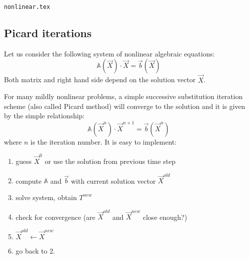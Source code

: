 \begin{flushright} {\tiny {\color{gray} \tt nonlinear.tex}} \end{flushright}




\subsection{Picard iterations} \label{ss:picard}

Let us consider the following system of nonlinear algebraic equations:
\[
\mathbb{A}(\vec X) \cdot \vec X = \vec b(\vec X)
\]
Both matrix and right hand side depend on the solution vector $\vec X$.

For many mildly nonlinear problems, a simple successive substitution 
iteration scheme (also called Picard method) will converge to the solution
and it is given by the simple relationship:
\[
\mathbb{A}(\vec X^n) \cdot \vec X^{n+1} = \vec b(\vec X^n)
\]
where $n$ is the iteration number. 
It is easy to implement:
\begin{enumerate}
\item guess $\vec X^0$ or use the solution from previous time step
\item compute $\mathbb{A}$ and $\vec b$ with current solution vector $\vec X^{old}$
\item solve system, obtain $T^{new}$
\item check for convergence (are $\vec X^{old}$ and $\vec X^{new}$ close enough?)
\item $\vec X^{old} \leftarrow \vec X^{new}$
\item go back to 2.
\end{enumerate}

